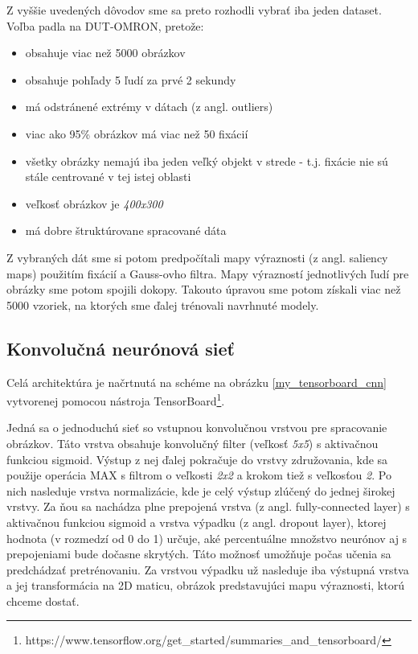 
Z vyššie uvedených dôvodov sme sa preto rozhodli vybrať iba jeden dataset. Voľba padla na DUT-OMRON\cite{dut-omron}, pretože:
\begin{itemize}
	\item obsahuje viac než 5000 obrázkov
	\item obsahuje pohľady 5 ľudí za prvé 2 sekundy
	\item má odstránené extrémy v dátach (z angl. outliers)
	\item viac ako 95\% obrázkov má viac než 50 fixácií
	\item všetky obrázky nemajú iba jeden veľký objekt v strede - t.j. fixácie nie sú stále centrované v tej istej oblasti
	\item veľkosť obrázkov je \textit{400x300}
	\item má dobre štruktúrovane spracované dáta
\end{itemize} 

Z vybraných dát sme si potom predpočítali mapy výraznosti (z angl. saliency maps) použitím fixácií a Gauss-ovho filtra. Mapy výrazností jednotlivých ľudí pre obrázky sme potom spojili dokopy. Takouto úpravou sme potom získali viac než 5000 vzoriek, na ktorých sme ďalej trénovali navrhnuté modely.

\subsection{Konvolučná neurónová sieť}
\label{nn_popis}

Celá architektúra je načrtnutá na schéme na obrázku \ref{my_tensorboard_cnn} vytvorenej pomocou nástroja  TensorBoard\footnote{https://www.tensorflow.org/get\_started/summaries\_and\_tensorboard/}.

Jedná sa o jednoduchú sieť so vstupnou konvolučnou vrstvou pre spracovanie obrázkov. Táto vrstva obsahuje konvolučný filter (veľkosť \textit{5x5}) s aktivačnou funkciou sigmoid. Výstup z nej ďalej pokračuje do vrstvy združovania, kde sa použije operácia MAX s filtrom o veľkosti \textit{2x2} a krokom tiež s veľkosťou \textit{2}. Po nich nasleduje vrstva normalizácie, kde je celý výstup zlúčený do jednej širokej vrstvy. Za ňou sa nachádza plne prepojená vrstva (z angl. fully-connected layer) s aktivačnou funkciou sigmoid a vrstva výpadku (z angl. dropout layer\cite{dropout}), ktorej hodnota (v rozmedzí od 0 do 1) určuje, aké percentuálne množstvo neurónov aj s prepojeniami bude dočasne skrytých. Táto možnosť umožňuje počas učenia sa predchádzať pretrénovaniu. Za vrstvou výpadku už nasleduje iba výstupná vrstva a jej transformácia na 2D maticu, obrázok predstavujúci mapu výraznosti, ktorú chceme dostať.

